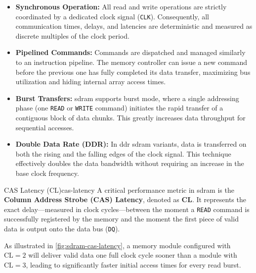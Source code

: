 \begin{itemize}
    \item \textbf{Synchronous Operation:} All read and write operations are strictly coordinated by a dedicated clock signal (\texttt{CLK}). Consequently, all communication times, delays, and latencies are deterministic and measured as discrete multiples of the clock period.
    \item \textbf{Pipelined Commands:} Commands are dispatched and managed similarly to an instruction pipeline. The memory controller can issue a new command before the previous one has fully completed its data transfer, maximizing bus utilization and hiding internal array access times.
    \item \textbf{Burst Transfers:} \gls{sdram} supports burst mode, where a single addressing phase (one \texttt{READ} or \texttt{WRITE} command) initiates the rapid transfer of a contiguous block of data chunks. This greatly increases data throughput for sequential accesses.
    \item \textbf{Double Data Rate (DDR):} In \gls{ddr} \gls{sdram} variants, data is transferred on both the rising and the falling edges of the clock signal. This technique effectively doubles the data bandwidth without requiring an increase in the base clock frequency.
\end{itemize}

\begin{concept}{CAS Latency (CL)}{cas-latency}
    A critical performance metric in \gls{sdram} is the \textbf{Column Address Strobe (CAS) Latency}, denoted as \textbf{CL}. It represents the exact delay—measured in clock cycles—between the moment a \texttt{READ} command is successfully registered by the memory and the moment the first piece of valid data is output onto the data bus (\texttt{DQ}). 
    
    As illustrated in \cref{fig:sdram-cas-latency}, a memory module configured with $\text{CL} = 2$ will deliver valid data one full clock cycle sooner than a module with $\text{CL} = 3$, leading to significantly faster initial access times for every read burst.
\end{concept}


